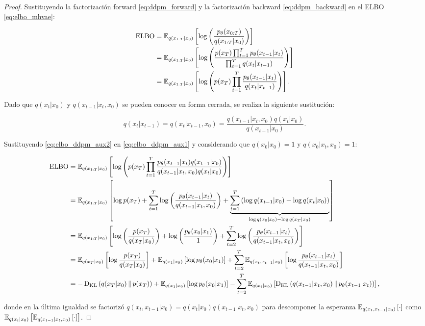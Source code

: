 \begin{proof}
    Sustituyendo la factorización forward \eqref{eq:ddpm_forward} y la factorización backward \eqref{eq:ddpm_backward} en el ELBO \eqref{eq:elbo_mhvae}:

    \begin{align}
        \operatorname{ELBO} &= \mathbb{E}_{q(x_{1:T}|x_0)}\left[\log\left(\frac{p_\theta(x_{0:T})}{q(x_{1:T}|x_0)}\right)\right]\nonumber\\
        &= \mathbb{E}_{q(x_{1:T}|x_0)}\left[\log\left(\frac{p(x_T)\prod_{t=1}^{T} p_\theta(x_{t-1}|x_t)}{\prod_{t=1}^{T} q(x_t|x_{t-1})}\right)\right]\nonumber\\
        &= \mathbb{E}_{q(x_{1:T}|x_0)}\left[\log\left(p(x_T)\prod_{t=1}^{T}\frac{p_\theta(x_{t-1}|x_t)}{q(x_t|x_{t-1})}\right)\right]\label{eq:elbo_ddpm_aux1}.
    \end{align}

    Dado que $q(x_t|x_0)$ y $q(x_{t-1}|x_t,x_0)$ se pueden conocer en forma cerrada, se realiza la siguiente sustitución:

    \begin{equation}
        \label{eq:elbo_ddpm_aux2}
        q(x_t|x_{t-1}) = q(x_t|x_{t-1},x_0) = \frac{q(x_{t-1}|x_t,x_0)q(x_t|x_0)}{q(x_{t-1}|x_0)}.
    \end{equation}

    Sustituyendo \eqref{eq:elbo_ddpm_aux2} en \eqref{eq:elbo_ddpm_aux1} y considerando que $q(x_0|x_0)=1$ y $q(x_0|x_t,x_0)=1$:

    \begin{align*}
        \operatorname{ELBO} &= \mathbb{E}_{q(x_{1:T}|x_0)}\left[\log\left(p(x_T)\prod_{t=1}^{T}\frac{p_\theta(x_{t-1}|x_t)q(x_{t-1}|x_0)}{q(x_{t-1}|x_t,x_0)q(x_t|x_0)}\right)\right]\\
        &= \mathbb{E}_{q(x_{1:T}|x_0)}\left[\log p(x_T) + \sum_{t=1}^T \log\left(\frac{p_\theta(x_{t-1}|x_t)}{q(x_{t-1}|x_t,x_0)}\right) + \underbrace{\sum_{t=1}^T \left(\log q(x_{t-1}|x_0)-\log q(x_t|x_0)\right)}_{\log q(x_0|x_0)-\log q(x_T|x_0)}\right]\\
        &= \mathbb{E}_{q(x_{1:T}|x_0)}\left[\log\left(\frac{p(x_T)}{q(x_T|x_0)}\right) + \log\left(\frac{p_\theta(x_0|x_1)}{1}\right) + \sum_{t=2}^T \log\left(\frac{p_\theta(x_{t-1}|x_t)}{q(x_{t-1}|x_t,x_0)}\right)\right]\\
        &= \mathbb{E}_{q(x_T|x_0)}\left[\log \frac{p(x_T)}{q(x_T|x_0)}\right] + \mathbb{E}_{q(x_1|x_0)}\left[\log p_\theta(x_0|x_1)\right] + \sum_{t=2}^T \mathbb{E}_{q(x_t,x_{t-1}|x_0)}\left[\log\frac{p_\theta(x_{t-1}|x_t)}{q(x_{t-1}|x_t,x_0)}\right]\\
        &= -\operatorname{D_{KL}}\left(q(x_T|x_0)\,\|\,p(x_T)\right) + \mathbb{E}_{q(x_1|x_0)}\left[\log p_\theta(x_0|x_1)\right] - \sum_{t=2}^T \mathbb{E}_{q(x_t|x_0)}\left[\operatorname{D_{KL}}\left(q(x_{t-1}|x_t,x_0)\,\|\,p_\theta(x_{t-1}|x_t)\right)\right],
    \end{align*}

    donde en la última igualdad se factorizó $q(x_t,x_{t-1}|x_0)=q(x_t|x_0)q(x_{t-1}|x_t,x_0)$ para descomponer la esperanza $\mathbb{E}_{q(x_t,x_{t-1}|x_0)}\left[\cdot\right]$ como $\mathbb{E}_{q(x_t|x_0)}\left[\mathbb{E}_{q(x_{t-1}|x_t,x_0)}\left[\cdot\right]\right]$.
\end{proof}

